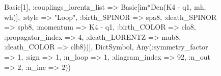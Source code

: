 \documentclass{revtex4}
\begin{document}
\begin{figure}[!htb]
\begin{center}
{Basic[1], :couplings_lorentz_list => Basic[im*Den(K4 - q1, mh, wh)], :style => "Loop", :birth_SPINOR => spa8, :death_SPINOR => spb8, :momentum => K4 - q1, :birth_COLOR => cla8, :propagator_index => 4, :death_LORENTZ => mub8, :death_COLOR => clb8))], Dict{Symbol, Any}(:symmetry_factor => 1, :sign => 1, :n_loop => 1, :diagram_index => 92, :n_out => 2, :n_inc => 2)) 
}
\end{center}
\end{figure}
\end{document}
